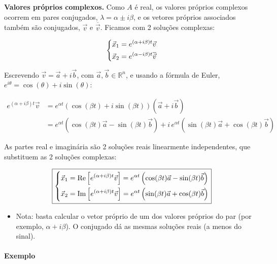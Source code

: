 \documentclass{article}
\begin{document}
\smallskip

\textbf{Valores próprios complexos.}
Como $A$ é real, os valores próprios complexos ocorrem em pares conjugados, $\lambda = \alpha \pm i \beta$,
e os vetores próprios associados também são conjugados, $\vec{v}$ e $\overline{\vec{v}}$.
Ficamos com 2 soluções complexas:

\begin{gather*}
\begin{dcases}
\vec{x}_1 = e^{(\alpha + i \beta)t}\vec{v} \\
\vec{x}_2 = e^{(\alpha - i \beta)t}\overline{\vec{v}}
\end{dcases}
\end{gather*}

Escrevendo $\vec{v} = \vec{a} + i\vec{b}$, com $\vec{a}, \vec{b} \in \mathbb{R}^n$, e usando a fórmula de Euler,
$e^{i \theta} = \cos(\theta) + i \sin(\theta)$:

\begin{align*}
e^{(\alpha + i \beta)t}\vec{v}
&= e^{\alpha t} \left( \cos(\beta t) + i \sin(\beta t) \right) \left( \vec{a} + i\vec{b} \right) \\
&= e^{\alpha t} \left( \cos(\beta t)\vec{a} - \sin(\beta t)\vec{b} \right)
+ i \, e^{\alpha t} \left( \sin(\beta t)\vec{a} + \cos(\beta t)\vec{b} \right)
\end{align*}

As partes real e imaginária são 2 soluções reais linearmente independentes, que substituem as 2 soluções
complexas:

\begin{gather*}
\boxed{
\begin{dcases}
\vec{x}_1 = \operatorname{Re}\left[ e^{(\alpha + i \beta)t}\vec{v} \right]
= e^{\alpha t} \left( \cos(\beta t)\vec{a} - \sin(\beta t)\vec{b} \right) \\
\vec{x}_2 = \operatorname{Im}\left[ e^{(\alpha + i \beta)t}\vec{v} \right]
= e^{\alpha t} \left( \sin(\beta t)\vec{a} + \cos(\beta t)\vec{b} \right)
\end{dcases}
}
\end{gather*}

\begin{itemize}
    \item Nota: basta calcular o vetor próprio de um dos valores próprios do par (por exemplo,
    $\alpha + i \beta$). O conjugado dá as mesmas soluções reais (a menos do sinal).
\end{itemize}

\paragraph{Exemplo}
\end{document}
